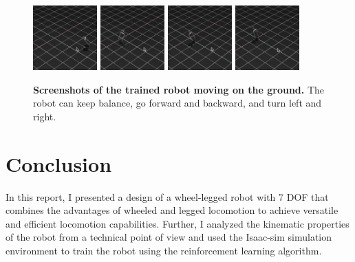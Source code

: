 \documentclass{article}
\begin{document}
\begin{figure}
  \centering
    \includegraphics[width=0.22\textwidth]{assets/g1w_1.png}
    \includegraphics[width=0.22\textwidth]{assets/g1w_2.png}
    \includegraphics[width=0.22\textwidth]{assets/g1w_3.png}
    \includegraphics[width=0.22\textwidth]{assets/g1w_4.png}
  \caption{\textbf{Screenshots of the trained robot moving on the ground.} The robot can keep balance, go forward and backward, and turn left and right.\cite{web:g1w_move}}
    \label{fig:robot_movement}
\end{figure}

\newpage

\section*{Conclusion}
In this report, I presented a design of a wheel-legged robot with 7 DOF that combines the advantages of wheeled and legged locomotion to achieve versatile and efficient locomotion capabilities.
Further, I analyzed the kinematic properties of the robot from a technical point of view and used the Isaac-sim simulation environment to train the robot using the reinforcement learning algorithm.
\end{document}
